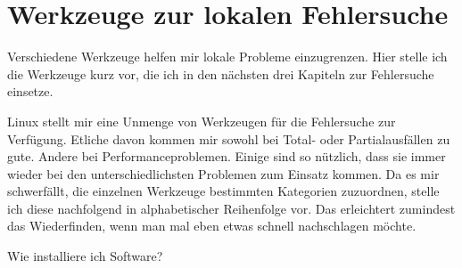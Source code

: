 \chapter{Werkzeuge zur lokalen Fehlersuche}
\label{cha:lokal-werkzeuge}

\begin{abstractsec}
  Verschiedene Werkzeuge helfen mir lokale Probleme einzugrenzen. Hier stelle
  ich die Werkzeuge kurz vor, die ich in den nächsten drei Kapiteln zur
  Fehlersuche einsetze.
\end{abstractsec}

\begin{normaltext}
  Linux stellt mir eine Unmenge von Werkzeugen für die Fehlersuche zur
  Verfügung. Etliche davon kommen mir sowohl bei Total- oder Partialausfällen
  zu gute. Andere bei Performanceproblemen. Einige sind so nützlich, dass sie
  immer wieder bei den unterschiedlichsten Problemen zum Einsatz kommen. Da
  es mir schwerfällt, die einzelnen Werkzeuge bestimmten Kategorien
  zuzuordnen, stelle ich diese nachfolgend in alphabetischer Reihenfolge vor.
  Das erleichtert zumindest das Wiederfinden, wenn man mal eben etwas schnell
  nachschlagen möchte.
\end{normaltext}

\begin{notes}
\item Wie installiere ich Software?
\end{notes}

